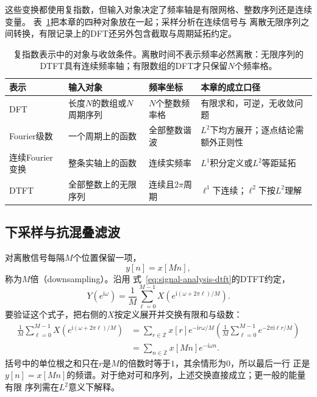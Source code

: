 这些变换都使用复指数，但输入对象决定了频率轴是有限网格、整数序列还是连续变量。
表~\ref{tab:reader-fourier-objects}把本章的四种对象放在一起；采样分析在连续信号与
离散无限序列之间转换，有限记录上的DFT还另外包含截取与周期延拓约定。
\begin{table}[htbp]
  \centering
  \begin{tabularx}{\linewidth}{lXXX}
    \toprule
    表示 & 输入对象 & 频率坐标 & 本章的成立口径\\
    \midrule
    DFT & 长度$N$的数组或$N$周期序列 & $N$个整数频率格 & 有限求和，可逆，无收敛问题\\
    Fourier级数 & 一个周期上的函数 & 全部整数谐波 & $L^2$下均方展开；逐点结论需额外正则性\\
    连续Fourier变换 & 整条实轴上的函数 & 连续实频率 & $L^1$积分定义或$L^2$等距延拓\\
    DTFT & 全部整数上的无限序列 & 连续且$2\pi$周期 & $\ell^1$下连续；$\ell^2$下按$L^2$理解\\
    \bottomrule
  \end{tabularx}
  \caption{复指数表示中的对象与收敛条件。离散时间不表示频率必然离散：无限序列的
  DTFT具有连续频率轴；有限数组的DFT才只保留$N$个频率格。}
  \label{tab:reader-fourier-objects}
\end{table}
\subsection{下采样与抗混叠滤波}

对离散信号每隔$M$个位置保留一项，
\[
  y[n]=x[Mn],
\]
称为$M$倍（downsampling）。沿用
式~\eqref{eq:signal-analysis-dtft}的DTFT约定，
\begin{equation}
  Y(e^{\mathrm{i}\omega})
  =
  \frac{1}{M}
  \sum_{\ell=0}^{M-1}
  X\left(e^{\mathrm{i}(\omega+2\pi\ell)/M}\right).
  \label{eq:signal-analysis-downsampling-spectrum}
\end{equation}
要验证这个式子，把右侧的$X$按定义展开并交换有限和与级数：
\begin{align*}
  \frac{1}{M}\sum_{\ell=0}^{M-1}
  X\left(e^{\mathrm{i}(\omega+2\pi\ell)/M}\right)
  &=
  \sum_{r\in\mathbb{Z}}x[r]e^{-\mathrm{i}r\omega/M}
  \left(
    \frac{1}{M}\sum_{\ell=0}^{M-1}
    e^{-2\pi\mathrm{i}\ell r/M}
  \right)\\
  &=
  \sum_{n\in\mathbb{Z}}x[Mn]e^{-\mathrm{i}\omega n}.
\end{align*}
括号中的单位根之和只在$r$是$M$的倍数时等于$1$，其余情形为$0$，所以最后一行
正是$y[n]=x[Mn]$的频谱。对于绝对可和序列，上述交换直接成立；更一般的能量有限
序列需在$L^2$意义下解释。

